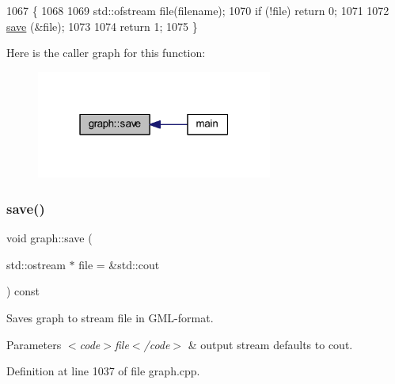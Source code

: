 \begin{DoxyCode}
1067                                            \{
1068     
1069     std::ofstream file(filename);
1070     \textcolor{keywordflow}{if} (!file) \textcolor{keywordflow}{return} 0;
1071     
1072     \mbox{\hyperlink{classgraph_a7bd0712a528249d1585085a64ac3e661}{save}} (&file);
1073 
1074     \textcolor{keywordflow}{return} 1;
1075 \}
\end{DoxyCode}
Here is the caller graph for this function\+:
\nopagebreak
\begin{figure}[H]
\begin{center}
\leavevmode
\includegraphics[width=220pt]{classgraph_a7bd0712a528249d1585085a64ac3e661_icgraph}
\end{center}
\end{figure}
\mbox{\label{classgraph_ad53bd0f3c96616b7f2d44abdce3df6de}} 
\subsubsection{\texorpdfstring{save()}{save()}\hspace{0.1cm}{\footnotesize\ttfamily [2/2]}}
{\footnotesize\ttfamily void graph\+::save (\begin{DoxyParamCaption}\item[{std\+::ostream $\ast$}]{file = {\ttfamily \&std\+:\+:cout} }\end{DoxyParamCaption}) const}

Saves graph to stream {\ttfamily file} in G\+M\+L-\/format.


\begin{DoxyParams}{Parameters}
{\em $<$code$>$file$<$/code$>$} & output stream defaults to cout. \\
\hline
\end{DoxyParams}


Definition at line 1037 of file graph.\+cpp.


